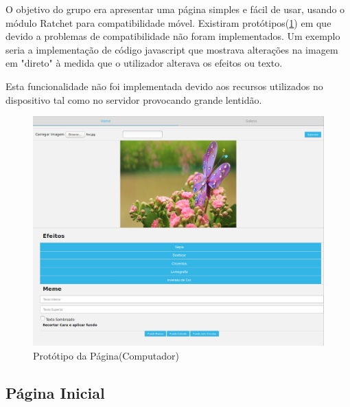 \documentclass{report}
\begin{document}
O objetivo do grupo era apresentar uma página simples e fácil de usar, usando o módulo Ratchet para compatibilidade móvel. Existiram protótipos(\ref{ProtPag}) em que devido a problemas de compatibilidade não foram implementados. Um exemplo seria a implementação de código javascript que mostrava alterações na imagem em "direto" à medida que o utilizador alterava os efeitos ou texto. 

Esta funcionalidade não foi implementada devido aos recursos utilizados no dispositivo tal como no servidor provocando grande lentidão.
\begin{figure}[b]
 \center
 \includegraphics[scale=0.5]{prototype.png}
 \caption{Protótipo da Página(Computador)}
 \label{ProtPag}
\end{figure}



\subsection{Página Inicial}
\end{document}

